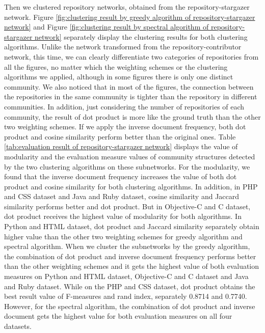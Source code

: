\documentclass[12pt,oneside,final]{vlsithesis}
\begin{document}
Then we clustered repository networks, obtained from the repository-stargazer network. Figure \ref{fig:clustering result by greedy algorithm of repository-stargazer network} and Figure \ref{fig:clustering result by spectral algorithm of repository-stargazer network}  separately display the clustering results for both clustering algorithms. Unlike the network transformed from the repository-contributor network, this time, we can clearly differentiate two categories of repositories from all the figures, no matter which the weighting schemes or the clustering algorithms we applied, although in some figures there is only one distinct community. We also noticed that  in most of the figures, the connection between the repositories in the same community is tighter than the repository in different communities. In addition, just considering the number of repositories of each community, the result of dot product is more like the ground truth than the other two weighting schemes. If we apply the inverse document frequency, both dot product and cosine similarity perform better than the original ones. Table \ref{tab:evaluation result of repository-stargazer network} displays the value of modularity and the evaluation measure values of community structures detected by the two clustering algorithms on these subnetworks. For the modularity, we found that the inverse document frequency increases the value of both dot product and cosine similarity for both clustering algorithms. In addition, in PHP and CSS dataset and Java and Ruby dataset, cosine similarity and Jaccard similarity performs better and dot product. But in Objective-C and C dataset, dot product receives the highest value of modularity for both algorithms. In Python and HTML dataset, dot product and Jaccard similarity separately obtain higher value than the other two weighting schemes for greedy algorithm and spectral algorithm. When we cluster the subnetworks by the greedy algorithm, the combination of dot product and inverse document frequency performs better than the other weighting schemes and it gets the highest value of both evaluation measures on Python and HTML dataset, Objective-C and C dataset and Java and Ruby dataset. While on the PHP and CSS dataset, dot product obtains the best result value of F-measures and rand index, separately 0.8714 and 0.7740. However, for the spectral algorithm, the combination of dot product and inverse document gets the highest value for both evaluation measures on all four datasets. 
\end{document}
